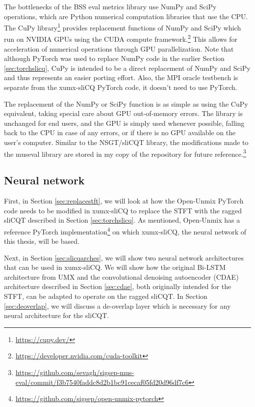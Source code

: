\documentclass[report.tex]{subfiles}
\begin{document}
The bottlenecks of the BSS eval metrics library use NumPy and SciPy operations, which are Python numerical computation libraries that use the CPU. The CuPy library\footnote{\url{https://cupy.dev/}} provides replacement functions of NumPy and SciPy which run on NVIDIA GPUs using the CUDA compute framework.\footnote{\url{https://developer.nvidia.com/cuda-toolkit}} This allows for acceleration of numerical operations through GPU parallelization. Note that although PyTorch was used to replace NumPy code in the earlier Section \ref{sec:torchslicq}, CuPy is intended to be a direct replacement of NumPy and SciPy and thus represents an easier porting effort. Also, the MPI oracle testbench is separate from the xumx-sliCQ PyTorch code, it doesn't need to use PyTorch.

The replacement of the NumPy or SciPy function is as simple as using the CuPy equivalent, taking special care about GPU out-of-memory errors. The library is unchanged for end users, and the GPU is simply used whenever possible, falling back to the CPU in case of any errors, or if there is no GPU available on the user's computer. Similar to the NSGT/sliCQT library, the modifications made to the museval library are stored in my copy of the repository for future reference.\footnote{\url{https://github.com/sevagh/sigsep-mus-eval/commit/f3b7540faddc8d2b1bc91cecaf05fd20d96df7c6}}

\newpagefill

\subsection{Neural network}
\label{sec:neuralnet}

First, in Section \ref{sec:replacestft}, we will look at how the Open-Unmix PyTorch code needs to be modified in xumx-sliCQ to replace the STFT with the ragged sliCQT described in Section \ref{sec:torchslicq}. As mentioned, Open-Unmix has a reference PyTorch implementation\footnote{\url{https://github.com/sigsep/open-unmix-pytorch}} on which xumx-sliCQ, the neural network of this thesis, will be based.

Next, in Section \ref{sec:slicqarches}, we will show two neural network architectures that can be used in xumx-sliCQ. We will show how the original Bi-LSTM architecture from UMX and the convolutional denoising autoencoder (CDAE) architecture described in Section \ref{sec:cdae}, both originally intended for the STFT, can be adapted to operate on the ragged sliCQT. In Section \ref{sec:deoverlap}, we will discuss a de-overlap layer which is necessary for any neural architecture for the sliCQT.
\end{document}
